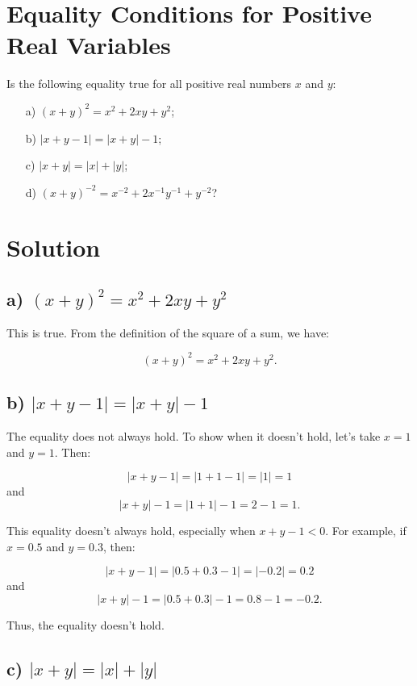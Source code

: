 \documentclass{article}
\begin{document}
\section*{Equality Conditions for Positive Real Variables}

Is the following equality true for all positive real numbers $x$ and $y$:
\begin{itemize}
    \item[a)] $(x + y)^2 = x^2 + 2xy + y^2$;
    \item[b)] $|x + y - 1| = |x + y| - 1$;
    \item[c)] $|x + y| = |x| + |y|$;
    \item[d)] $(x + y)^{-2} = x^{-2} + 2x^{-1}y^{-1} + y^{-2}$?
\end{itemize}

\section*{Solution}

\subsection*{a) $(x + y)^2 = x^2 + 2xy + y^2$}

This is true. From the definition of the square of a sum, we have:

\[
(x + y)^2 = x^2 + 2xy + y^2.
\]

\subsection*{b) $|x + y - 1| = |x + y| - 1$}

The equality does not always hold. To show when it doesn't hold, let's take $x = 1$ and $y = 1$. Then:

\[
|x + y - 1| = |1 + 1 - 1| = |1| = 1
\]
and
\[
|x + y| - 1 = |1 + 1| - 1 = 2 - 1 = 1.
\]

This equality doesn't always hold, especially when $x + y - 1 < 0$. For example, if $x = 0.5$ and $y = 0.3$, then:

\[
|x + y - 1| = |0.5 + 0.3 - 1| = |-0.2| = 0.2
\]
and
\[
|x + y| - 1 = |0.5 + 0.3| - 1 = 0.8 - 1 = -0.2.
\]

Thus, the equality doesn't hold.

\subsection*{c) $|x + y| = |x| + |y|$}
\end{document}
